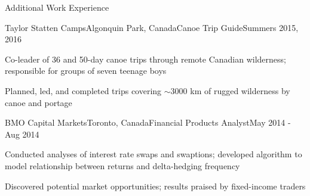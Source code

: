 \documentclass{resume} %
\begin{document}
\begin{rSection}{Additional Work Experience}

\begin{rSubsection}{Taylor Statten Camps}{Algonquin Park, Canada}{Canoe Trip Guide}{Summers 2015, 2016}

\item Co-leader of 36 and 50-day canoe trips through remote Canadian wilderness; responsible for groups of seven teenage boys
\item Planned, led, and completed trips covering ${\sim}3000$ km of rugged wilderness by canoe and portage

\end{rSubsection}


\begin{rSubsection}{BMO Capital Markets}{Toronto, Canada}{Financial Products Analyst}{May 2014 - Aug 2014}

\item Conducted analyses of interest rate swaps and swaptions; developed algorithm to model relationship between returns and delta-hedging frequency
\item Discovered potential market opportunities; results praised by fixed-income traders
    
\end{rSubsection}

\end{rSection}



%
%
%
%
%
%
\end{document}
